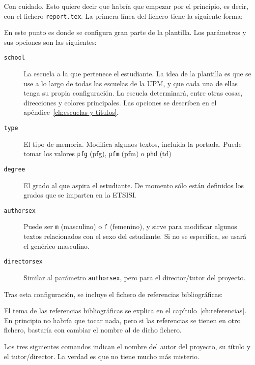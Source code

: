 Con cuidado. Esto quiere decir que habría que empezar por el principio, es decir, con el fichero \texttt{report.tex}. La primera línea del fichero tiene la siguiente forma:



En este punto es donde se configura gran parte de la plantilla. Los parámetros y sus opciones son las siguientes:

\begin{description}
    \item[\texttt{school}] La escuela a la que pertenece el estudiante. La idea de la plantilla es que se use a lo largo de todas las escuelas de la UPM, y que cada una de ellas tenga su propia configuración. La escuela determinará, entre otras cosas, direcciones y colores principales. Las opciones se describen en el apéndice~\ref{ch:escuelas-y-titulos}.
    \item[\texttt{type}] El tipo de memoria. Modifica algunos textos, incluida la portada. Puede tomar los valores \texttt{pfg} (\acrlong{pfg}), \texttt{pfm}  (\acrlong{pfm}) o \texttt{phd} (\acrlong{td})
    \item[\texttt{degree}] El grado al que aspira el estudiante. De momento sólo están definidos los grados que se imparten en la ETSISI.
    \item[\texttt{authorsex}] Puede ser \texttt{m} (masculino) o \texttt{f} (femenino), y sirve para modificar algunos textos relacionados con el sexo del estudiante. Si no se especifica, se usará el genérico masculino.
    \item[\texttt{directorsex}] Similar al parámetro \texttt{authorsex}, pero para el director/tutor del proyecto.
\end{description}

Tras esta configuración, se incluye el fichero de referencias bibliográficas:



El tema de las referencias bibliográficas se explica en el capítulo~\ref{ch:referencias}. En principio no habría que tocar nada, pero si las referencias se tienen en otro fichero, bastaría con cambiar el nombre al de dicho fichero.

Los tres siguientes comandos indican el nombre del autor del proyecto, su título y el tutor/director. La verdad es que no tiene mucho más misterio.

